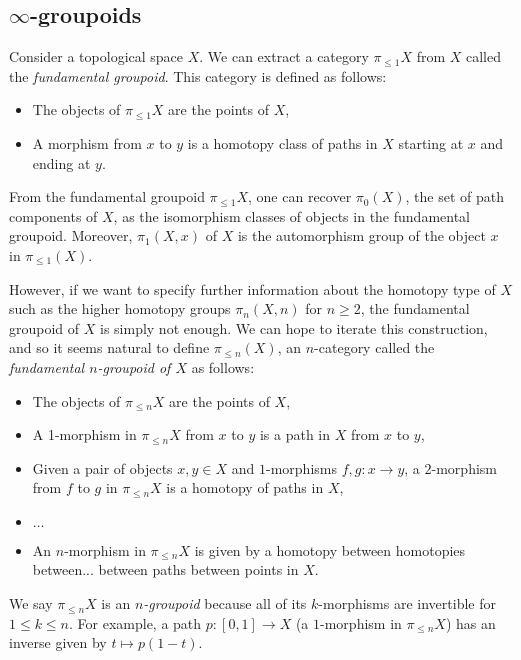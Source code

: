 \documentclass[a4paper,11pt]{article}
\theoremstyle{plain}
\theoremstyle{definition}
\theoremstyle{remark}
\begin{document}
\subsection{$\infty$-groupoids}

Consider a topological space $X$. We can extract a category $\pi_{\leq 1} X$ from $X$ called the \textit{fundamental groupoid}. This category is defined as follows:
\begin{itemize}
    \item The objects of $\pi_{\leq 1} X$ are the points of $X$,
    \item A morphism from $x$ to $y$ is a homotopy class of paths in $X$ starting at $x$ and ending at $y$.
\end{itemize}

From the fundamental groupoid $\pi_{\leq 1} X$, one can recover $\pi_0(X)$, the set of path components of $X$, as the isomorphism classes of objects in the fundamental groupoid. Moreover, $\pi_1(X,x)$ of $X$ is the automorphism group of the object $x$ in $\pi_{\leq 1}(X)$.  

However, if we want to specify further information about the homotopy type of $X$ such as the higher homotopy groups $\pi_n(X,n)$ for $n \geq 2$, the fundamental groupoid of $X$ is simply not enough. We can hope to iterate this construction, and so it seems natural to define $\pi_{\leq n}(X)$, an $n$-category called the \textit{fundamental $n$-groupoid of $X$} as follows: 
\begin{itemize}
    \item The objects of $\pi_{\leq n} X$ are the points of $X$,
    \item A 1-morphism in $\pi_{\leq n} X$ from $x$ to $y$ is a path in $X$ from $x$ to $y$, 
    \item Given a pair of objects $x, y \in X$ and $1$-morphisms $f, g \colon x \to y$, a $2$-morphism from $f$ to $g$ in $\pi_{\leq n} X$ is a homotopy of paths in $X$,
    \item $\dots$
    \item An $n$-morphism in $\pi_{\leq n}X$ is given by a homotopy between homotopies between... between paths between points in $X$.
\end{itemize}

We say $\pi_{\leq n} X$ is an \textit{$n$-groupoid} because all of its $k$-morphisms are invertible for $1 \leq k \leq n$. For example, a path $p \colon [0,1] \to X$ (a $1$-morphism in $\pi_{\leq n} X$) has an inverse given by $t \mapsto p(1-t)$. 
\end{document}
